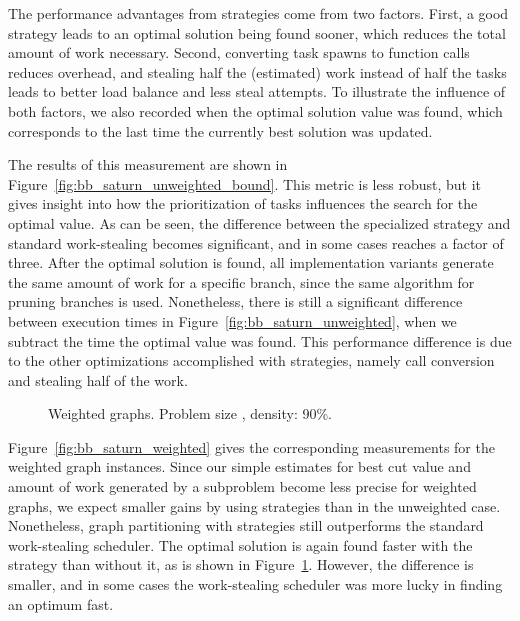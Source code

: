 \documentclass[a4paper,11pt]{article}
\begin{document}
The performance advantages from strategies come from two
factors. First, a good strategy leads to an optimal solution being
found sooner, which reduces the total amount of work
necessary. Second, converting task spawns to function calls reduces
overhead, and stealing half the (estimated) work instead of half the
tasks leads to better load balance and less steal attempts. To
illustrate the influence of both factors, we also recorded when the
optimal solution value was found, which corresponds to the last time
the currently best solution was updated.

The results of this measurement are shown in
Figure~\ref{fig:bb_saturn_unweighted_bound}. This metric is less
robust, but it gives insight into how the prioritization of tasks
influences the search for the optimal value. As can be seen, the
difference between the specialized strategy and standard work-stealing
becomes significant, and in some cases reaches a factor of
three. After the optimal solution is found, all implementation
variants generate the same amount of work for a specific branch, since
the same algorithm for pruning branches is used. Nonetheless, there is
still a significant difference between execution times in
Figure~\ref{fig:bb_saturn_unweighted}, when we subtract the time the
optimal value was found. This performance difference is due to the
other optimizations accomplished with strategies, namely call
conversion and stealing half of the work.

\begin{figure}
\centering
{}
\label{fig:bb_saturn_weighted}
\caption{Weighted graphs. Problem size , density: 90\%.}
\label{fig:bb_saturn_weighted_bound}
\end{figure}

Figure~\ref{fig:bb_saturn_weighted} gives the corresponding
measurements for the weighted graph instances.  Since our simple
estimates for best cut value and amount of work generated by a
subproblem become less precise for weighted graphs, we expect smaller
gains by using strategies than in the unweighted case.  Nonetheless,
graph partitioning with strategies still outperforms the standard
work-stealing scheduler. The optimal solution is again found
faster with the strategy than without it, as is shown in
Figure~\ref{fig:bb_saturn_weighted_bound}. However, the difference is
smaller, and in some cases the work-stealing scheduler was more
lucky in finding an optimum fast.
\end{document}
